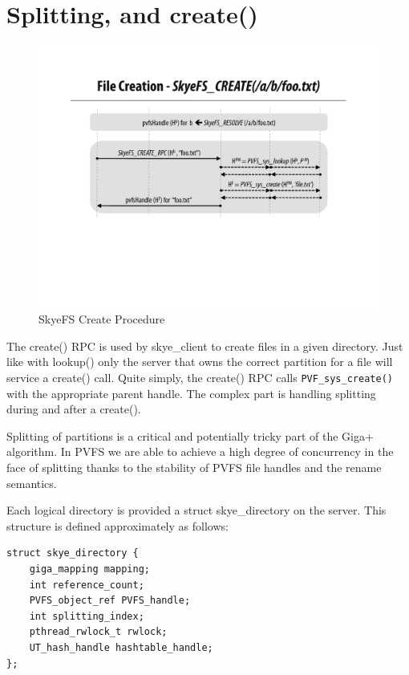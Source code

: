 \documentclass[letterpaper]{article}
\newcommand{\code}[1]{\texttt{#1}}
\begin{document}
\section{Splitting, and create()}
\begin{figure}
\begin{center}
\includegraphics[scale=0.4]{figure-create}
\end{center}
\caption{SkyeFS Create Procedure}
\end{figure}
The create() RPC is used by skye\_\-client to create files in a given
directory.  Just like with lookup() only the server that owns the correct
partition for a file will service a create() call.  Quite simply, the create()
RPC calls \code{PVF\_\-sys\_\-create()} with the appropriate parent handle.  The complex
part is handling splitting during and after a create().

Splitting of partitions is a critical and potentially tricky part of the Giga+
algorithm.  In PVFS we are able to achieve a high degree of concurrency in the
face of splitting thanks to the stability of PVFS file handles and the rename
semantics.

Each logical directory is provided a struct skye\_\-directory on the server.  This
structure is defined approximately as follows:

\begin{lstlisting}
struct skye_directory {
    giga_mapping mapping;
    int reference_count;
    PVFS_object_ref PVFS_handle;
    int splitting_index;
    pthread_rwlock_t rwlock;
    UT_hash_handle hashtable_handle;
};
\end{lstlisting}
\end{document}
